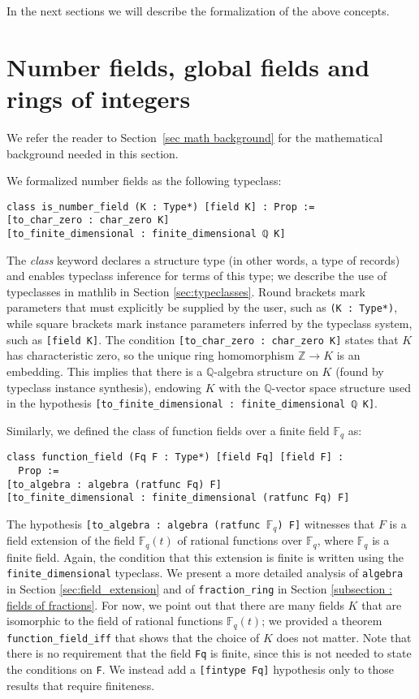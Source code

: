 \documentclass[sn-mathphys]{sn-jnl}%
\newcommand{\lean}[1]{\texttt{#1}\xspace}
\newcommand*{\Fq}[1][q]{\mathbb{F}_{#1}}
\newcommand{\mathlib}{\textsf{mathlib}\xspace}
\newcommand{\QQ}{\mathbb{Q}}
\renewcommand{\Z}{\mathbb{Z}}
\begin{document}
In the next sections we will describe the formalization of the above concepts.

\section{Number fields, global fields and rings of integers} \label{sec:number fields}

We refer the reader to Section~\ref{sec math background} for the mathematical background needed in this section.

We formalized number fields as the following typeclass:
\begin{lstlisting}
class is_number_field (K : Type*) [field K] : Prop :=
[to_char_zero : char_zero K]
[to_finite_dimensional : finite_dimensional ℚ K]
\end{lstlisting}
The \emph{class} keyword declares a structure type (in other words, a type of records) and enables typeclass inference for terms of this type;
we describe the use of typeclasses in \mathlib in Section \ref{sec:typeclasses}.
Round brackets mark parameters that must explicitly be supplied by the user, such as \lean{(K : Type*)}, while
square brackets mark instance parameters inferred by the typeclass system, such as \mbox{\lean{[field K]}}.
The condition \lean{[to\_char\_zero : char\_zero K]} states that $K$ has characteristic zero, so the unique ring homomorphism $\Z \to K$ is an embedding.
This implies that there is a $\QQ$-algebra structure on $K$ (found by typeclass instance synthesis), endowing $K$ with the $\QQ$-vector space structure used in the hypothesis \mbox{\lean{[to\_finite\_dimensional : finite\_dimensional ℚ K]}}.

Similarly, we defined the class of function fields over a finite field $\Fq$ as:
\begin{lstlisting}
class function_field (Fq F : Type*) [field Fq] [field F] :
  Prop :=
[to_algebra : algebra (ratfunc Fq) F]
[to_finite_dimensional : finite_dimensional (ratfunc Fq) F]
\end{lstlisting}
The hypothesis \lean{[to\_algebra : algebra (ratfunc $\Fq$) F]} witnesses that $F$ is a field extension of the field $\Fq[q](t)$ of rational functions over $\Fq[q]$, where $\Fq[q]$ is a finite field.
Again, the condition that this extension is finite is written using the \lean{finite\_dimensional} typeclass.
We present a more detailed analysis of \lean{algebra} in Section \ref{sec:field_extension} and of \lean{fraction\_ring} in Section \ref{subsection : fields of fractions}.
For now, we point out that there are many fields $K$ that are isomorphic to the field of rational functions $\Fq[q](t)$; we provided a theorem \lean{function\_field\_iff} that shows that the choice of $K$ does not matter.
Note that there is no requirement that the field \lean{Fq} is finite, since this is not needed to state the conditions on \lean{F}.
We instead add a \lean{[fintype Fq]} hypothesis only to those results that require finiteness.
\end{document}
